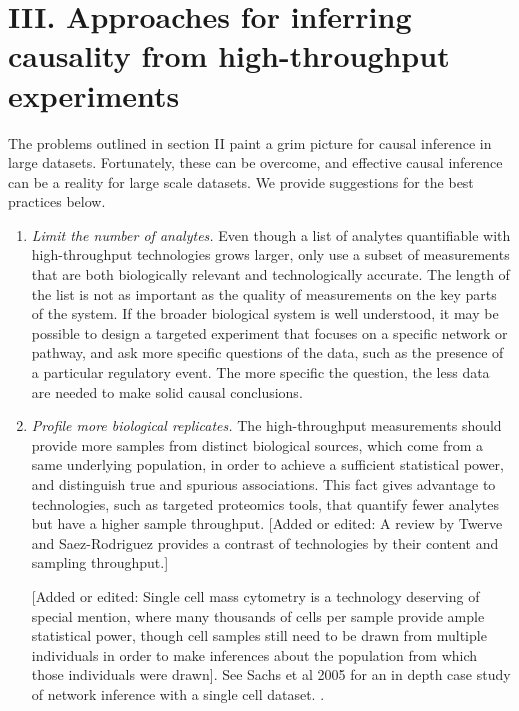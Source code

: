 \documentclass[journal=jacsat,manuscript=article]{achemso}
\def\added#1{{\color{magenta}[Added or edited: #1]}}
\begin{document}
\section{III. Approaches for inferring causality from high-throughput experiments}

The problems outlined in section II paint a grim picture for causal inference in large datasets. Fortunately, these can be overcome, and effective causal inference can be a reality for large scale datasets.  We provide suggestions for the best practices below.

\begin{enumerate}
\item \textit{Limit the number of analytes.} Even though a list of analytes quantifiable with high-throughput technologies grows larger, only use a subset of measurements that are both biologically relevant and technologically accurate. The length of the list is not as important as the quality of measurements on the key parts of the system.  If the broader biological system is well understood, it may be possible to design a targeted experiment that focuses on a specific network or pathway, and ask more specific questions of the data, such as the presence of a particular regulatory event.  The more specific the question, the less data are needed to make solid causal conclusions.  

\item \textit{Profile more biological replicates.}  The high-throughput measurements should provide more samples from distinct biological sources, which come from a same underlying population, in order to achieve a sufficient statistical power, and distinguish true and spurious associations.  This fact gives advantage to technologies, such as targeted proteomics tools, that quantify fewer analytes but have a higher sample throughput.  \added{A review by Twerve and Saez-Rodriguez provides a contrast of technologies by their content and sampling throughput\cite{SaezRodriguez:2012kx}.} 

\added{Single cell mass cytometry is a technology deserving of special mention, where many thousands of cells per sample provide ample statistical power, though cell samples still need to be drawn from multiple individuals in order to make inferences about the population from which those individuals were drawn}. See Sachs et al 2005 for an in depth case study of network inference with a single cell dataset. \cite{sachs2005causal}.  


\end{enumerate}
\end{document}
